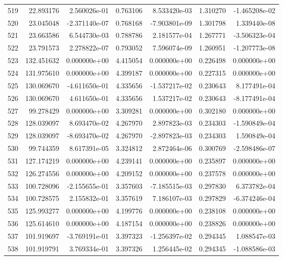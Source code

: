\begin{tabular}{rrrrrrr}
 519 &  22.893176 &  2.560026e-01 &  0.763106 &  8.533420e-03 &   1.310270 & -1.465208e-02 \\
 520 &  23.045048 & -2.371140e-07 &  0.768168 & -7.903801e-09 &   1.301798 &  1.339440e-08 \\
 521 &  23.663586 &  6.544730e-03 &  0.788786 &  2.181577e-04 &   1.267771 & -3.506323e-04 \\
 522 &  23.791573 &  2.278822e-07 &  0.793052 &  7.596074e-09 &   1.260951 & -1.207773e-08 \\
 523 & 132.451632 &  0.000000e+00 &  4.415054 &  0.000000e+00 &   0.226498 &  0.000000e+00 \\
 524 & 131.975610 &  0.000000e+00 &  4.399187 &  0.000000e+00 &   0.227315 &  0.000000e+00 \\
 525 & 130.069670 & -4.611650e-01 &  4.335656 & -1.537217e-02 &   0.230643 &  8.177491e-04 \\
 526 & 130.069670 &  4.611650e-01 &  4.335656 &  1.537217e-02 &   0.230643 & -8.177491e-04 \\
 527 &  99.278429 &  0.000000e+00 &  3.309281 &  0.000000e+00 &   0.302180 &  0.000000e+00 \\
 528 & 128.039097 &  8.693470e-02 &  4.267970 &  2.897823e-03 &   0.234303 & -1.590849e-04 \\
 529 & 128.039097 & -8.693470e-02 &  4.267970 & -2.897823e-03 &   0.234303 &  1.590849e-04 \\
 530 &  99.744359 &  8.617391e-05 &  3.324812 &  2.872464e-06 &   0.300769 & -2.598486e-07 \\
 531 & 127.174219 &  0.000000e+00 &  4.239141 &  0.000000e+00 &   0.235897 &  0.000000e+00 \\
 532 & 126.274556 &  0.000000e+00 &  4.209152 &  0.000000e+00 &   0.237578 &  0.000000e+00 \\
 533 & 100.728096 & -2.155655e-01 &  3.357603 & -7.185515e-03 &   0.297830 &  6.373782e-04 \\
 534 & 100.728575 &  2.155832e-01 &  3.357619 &  7.186107e-03 &   0.297829 & -6.374246e-04 \\
 535 & 125.993277 &  0.000000e+00 &  4.199776 &  0.000000e+00 &   0.238108 &  0.000000e+00 \\
 536 & 125.614610 &  0.000000e+00 &  4.187154 &  0.000000e+00 &   0.238826 &  0.000000e+00 \\
 537 & 101.919697 & -3.769191e-01 &  3.397323 & -1.256397e-02 &   0.294345 &  1.088547e-03 \\
 538 & 101.919791 &  3.769334e-01 &  3.397326 &  1.256445e-02 &   0.294345 & -1.088586e-03 \\

\end{tabular}
